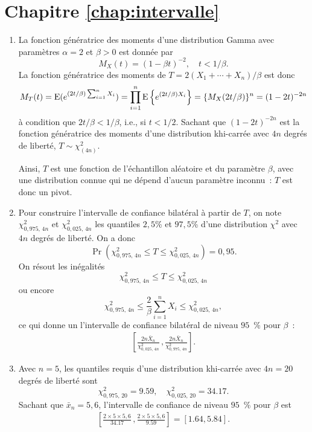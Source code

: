 \section*{Chapitre \ref{chap:intervalle}}

\begin{solution}{5.1}
\begin{enumerate}
\item La fonction génératrice des moments d'une distribution Gamma avec paramètres $\alpha = 2$ et $\beta > 0$ est donnée par
$$
M_X(t) = (1-\beta t)^{-2}, \quad t < 1/\beta.
$$
La fonction génératrice des moments de $T = 2(X_1 + \cdots + X_n)/\beta$ est donc
$$
M_T(t) = \operatorname{E} (e^{(2t/\beta) \sum_{i=1}^n X_i}) = \prod_{i=1}^n \operatorname{E} \left\{ e^{(2t/\beta) X_i} \right\} = \{ M_X(2t/\beta)\}^n = (1-2t)^{-2n}
$$
à condition que $2t/\beta < 1/\beta$, i.e., si $t < 1/2$. Sachant que $(1-2t)^{-2n}$ est la fonction génératrice des moments d'une distribution khi-carrée avec $4n$ degrés de liberté, $T \sim \chi^2_{(4n)}$.

Ainsi, $T$ est une fonction de l'échantillon aléatoire et du paramètre $\beta$, avec une distribution connue qui ne dépend d'aucun paramètre inconnu~: $T$ est donc un pivot.

\item Pour construire l'intervalle de confiance bilatéral à partir de $T$, on note $\chi^2_{0,975, \, 4n}$ et $\chi^2_{0,025, \, 4n}$ les quantiles $2,5$\% et $97,5$\% d'une distribution $\chi^2$ avec $4n$ degrés de liberté. On a donc
$$
\Pr( \chi^2_{0,975, \, 4n} \le T \le \chi^2_{0,025, \, 4n}) = 0,95.
$$
On résout les inégalités
$$
 \chi^2_{0,975, \, 4n} \le T \le \chi^2_{0,025, \, 4n}
 $$
ou encore
 $$
 \chi^2_{0,975, \, 4n} \le \frac{2}{\beta} \sum_{i=1}^n X_i \le \chi^2_{0,025, \, 4n},
$$
ce qui donne un l'intervalle de confiance bilatéral de niveau $95$~\% pour $\beta$~:
\begin{align*}
\left[ \frac{2n \bar X_n}{ \chi^2_{0,025, \, 4n}} \, , \frac{2n \bar X_n}{ \chi^2_{0,975, \, 4n}}\right].
\end{align*}

\item Avec $n = 5$, les quantiles requis d'une distribution khi-carrée avec $4n = 20$ degrés de liberté sont
$$
 \chi^2_{0,975, \, 20} = 9.59, \quad  \chi^2_{0,025, \, 20} = 34.17.
$$
Sachant que $\bar x_n = 5,6$, l'intervalle de confiance de niveau $95$~\% pour $\beta$ est
\begin{align*}
\left[ \frac{2\times 5\times 5,6}{ 34.17} \, , \frac{2\times 5\times 5,6}{ 9.59}\right] = [ 1.64, 5.84].
\end{align*}
\end{enumerate}
	
\end{solution}
